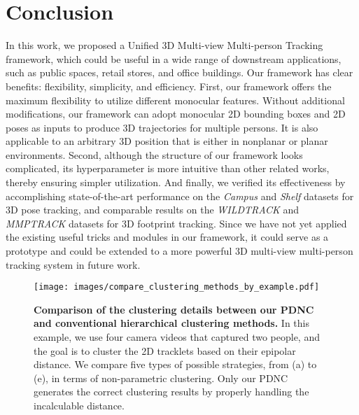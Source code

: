 \documentclass{CVM}
\begin{document}
  



\section{Conclusion}\label{sec:conclusion}

In this work, we proposed a Unified 3D Multi-view Multi-person Tracking framework, which could be useful in a wide range of downstream applications, such as public spaces, retail stores, and office buildings. Our framework has clear benefits: flexibility, simplicity, and efficiency. First, our framework offers the maximum flexibility to utilize different monocular features. Without additional modifications, our framework can adopt monocular 2D bounding boxes and 2D poses as inputs to produce 3D trajectories for multiple persons. It is also applicable to an arbitrary 3D position that is either in nonplanar or planar environments. Second, although the structure of our framework looks complicated, its hyperparameter is more intuitive than other related works, thereby ensuring simpler utilization. And finally, we verified its effectiveness by accomplishing state-of-the-art performance on the \textit{Campus} and \textit{Shelf} datasets for 3D pose tracking, and comparable results on the \textit{WILDTRACK} and \textit{MMPTRACK} datasets for 3D footprint tracking. Since we have not yet applied the existing useful tricks and modules in our framework, it could serve as a prototype and could be extended to a more powerful 3D multi-view multi-person tracking system in future work.

\appendix
\begin{figure*}[!h]
  \centering
  \texttt{[image: images/compare\_clustering\_methods\_by\_example.pdf]}
  \caption{\textbf{Comparison of the clustering details between our PDNC and conventional hierarchical clustering methods.} In this example, we use four camera videos that captured two people, and the goal is to cluster the 2D tracklets based on their epipolar distance. We compare five types of possible strategies, from (a) to (e), in terms of non-parametric clustering. Only our PDNC generates the correct clustering results by properly handling the incalculable distance.}\label{fig:compare_clustering}
\end{figure*}
\end{document}
